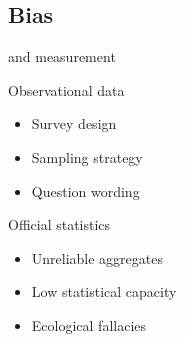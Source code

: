 \documentclass[t]{beamer}
\begin{document}
  \subsection{Bias}
  
  \begin{frame}[t]{ and measurement}
    
    \begin{block}{Observational data}

      \begin{itemize}
        \item Survey design
        \item Sampling strategy
        \item Question wording
      \end{itemize}
    
    \end{block}

    \begin{block}{Official statistics}
    
      \begin{itemize}

        \item Unreliable aggregates       %
        \item Low statistical capacity    %
				\item Ecological fallacies				%

      \end{itemize}

    \end{block}
        
  \end{frame}
  
\end{document}
